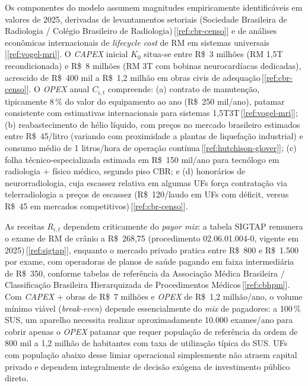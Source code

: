 \documentclass[12pt,a4paper,oneside]{article}
\begin{document}
Os componentes do modelo assumem magnitudes empiricamente
identificáveis em valores de 2025, derivadas de levantamentos
setoriais (Sociedade Brasileira de Radiologia / Colégio Brasileiro
de Radiologia)\,[\ref{ref:cbr-censo}] e de análises econômicas
internacionais de \textit{lifecycle cost} de RM em sistemas
universais\,[\ref{ref:vogel-mri}]. O \textit{CAPEX} inicial $K_0$
situa-se entre R\$~3 milhões (RM 1,5T recondicionada) e R\$~8
milhões (RM 3T com bobinas neurocardíacas dedicadas), acrescido
de R\$~400 mil a R\$~1,2 milhão em obras civis de
adequação\,[\ref{ref:cbr-censo}]. O \textit{OPEX} anual
$C_{i,t}$ compreende: (a) contrato de manutenção, tipicamente
8\,\% do valor do equipamento ao ano
(R\$~250 mil/ano), patamar consistente com
estimativas internacionais para sistemas
1,5T\textendash 3T\,[\ref{ref:vogel-mri}]; (b) reabastecimento de
hélio líquido, com preços no mercado brasileiro estimados entre
R\$~45/litro (variando com proximidade a plantas de
liquefação industrial) e consumo médio de 1
litros/hora de operação contínua\,[\ref{ref:hutchison-glover}];
(c) folha técnico-especializada estimada em R\$~150
mil/ano para tecnólogo em radiologia + físico médico, segundo
piso CBR; e (d) honorários de neurorradiologia, cuja escassez
relativa em algumas UFs força contratação via telerradiologia a
preços de escassez (R\$~120/laudo em UFs com
déficit, versus R\$~45 em mercados
competitivos)\,[\ref{ref:cbr-censo}].

As receitas $R_{i,t}$ dependem criticamente do
\textit{payor mix}: a tabela SIGTAP remunera o exame de RM de
crânio a R\$~268,75 (procedimento 02.06.01.004-0, vigente em
2025)\,[\ref{ref:sigtap}], enquanto o mercado privado pratica
entre R\$~800 e R\$~1.500 por exame, com operadoras de planos de
saúde pagando em faixa intermediária de R\$~350,
conforme tabelas de referência da Associação Médica Brasileira /
Classificação Brasileira Hierarquizada de Procedimentos
Médicos\,[\ref{ref:cbhpm}]. Com \textit{CAPEX} +
obras de R\$~7 milhões e \textit{OPEX} de R\$~1,2 milhão/ano, o
volume mínimo viável (\textit{break-even}) depende essencialmente
do \textit{mix} de pagadores: a 100\,\% SUS, um aparelho necessita
realizar aproximadamente 10.000 exames/ano para
cobrir apenas o \textit{OPEX} \textemdash{} patamar que requer
população de referência da ordem de 800 mil a 1,2 milhão de
habitantes com taxa de utilização típica do SUS. UFs com população
abaixo desse limiar operacional simplesmente não atraem capital
privado e dependem integralmente de decisão exógena de
investimento público direto.
\end{document}
